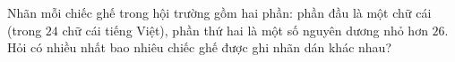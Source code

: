\begin{bt}%
	Nhãn mỗi chiếc ghế trong hội trường gồm hai phần: phần đầu là một chữ cái (trong $24$ chữ cái tiếng Việt), phần thứ hai là một số nguyên dương nhỏ hơn $26$. Hỏi có nhiều nhất bao nhiêu chiếc ghế được ghi nhãn dán khác nhau? 
\end{bt}

